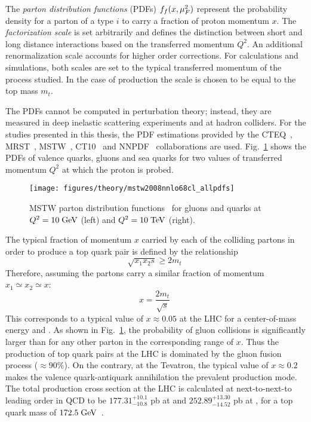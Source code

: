 The {\it parton distribution functions} (PDFs) $f_f(x,\mu_F^2{})$
represent the probability density for a parton of a type $i$ to carry
a fraction of proton momentum $x$. The {\it factorization scale}
\factscale{} is set arbitrarily and defines the distinction between
short and long distance interactions based on the transferred momentum
$Q^2$. An additional renormalization scale \renormscale{} accounts for higher
order corrections. For calculations and simulations, both scales are
set to the typical transferred momentum of the process studied. In the case of
\ttbar{} production the scale is chosen to be equal to the top mass $m_t$.
  
The PDFs cannot be computed in perturbation theory; instead, they are
measured in deep inelastic scattering experiments and at hadron colliders.
For the studies presented in this thesis, the PDF estimations
provided by the CTEQ~\cite{cteq6}, MRST~\cite{mrst}, MSTW~\cite{mstw}, CT10~\cite{ct10}
and NNPDF~\cite{nnpdf} collaborations are used. Fig.~\ref{fig:pdfs}
shows the PDFs of valence quarks, gluons and sea quarks for two values
of transferred momentum $Q^2$ at which the proton is probed. 

\begin{figure}[!htb]\centering
  \texttt{[image: figures/theory/mstw2008nnlo68cl\_allpdfs]}
  \caption{MSTW parton distribution functions~\cite{ct10} for gluons
    and quarks at $Q^2=10\; \mathrm{GeV}{}$ (left) and $Q^2=10\; \mathrm{TeV}{}$ (right).}
  \label{fig:pdfs}
\end{figure}

The typical fraction of momentum $x$ carried by each of the colliding
partons in order to produce a top quark pair is defined by the
relationship
\begin{equation}
\sqrt{x_1x_2s}\geq{}2m_t\phantom{.}
\end{equation}
Therefore, assuming the partons carry a similar fraction of momentum
$x_1\simeq{}x_2\simeq{}x$:
\begin{equation}
x=\frac{2m_t}{\sqrt{s}}
\phantom{.}
\end{equation}
This corresponds to a typical value of $x\approx{}0.05$ at the LHC for
a center-of-mass energy \seventev{} and \eighttev{}. As shown in
Fig.~\ref{fig:pdfs}, the probability of gluon collisions is
significantly larger than for any other parton in the corresponding
range of $x$. Thus the production of top quark pairs at the LHC is
dominated by the gluon fusion process ($\approx{}90\%$). On the
contrary, at the Tevatron, the typical value of $x\approx{}0.2$ makes
the valence quark-antiquark annihilation the prevalent \ttbar{}
production mode.
The total \ttbar{} production cross section at the LHC is calculated
at next-to-next-to leading order in
QCD to be
$177.31^{+10.1}_{-10.8}$ pb at \seventev{} and
$252.89^{+13.30}_{-14.52}$ pb at \eighttev{}, for a top quark mass of
$172.5 \; \mathrm{GeV}{}$~\cite{ttxs1,ttxs2,ttxs3,ttxs4,ttxs5,ttxs6,ttxs7}.
 
